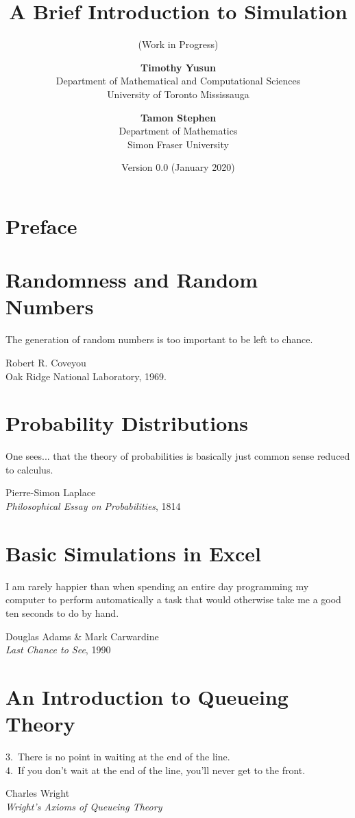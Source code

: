 \documentclass[11pt]{scrbook}
\title{A Brief Introduction to Simulation}
\subtitle{(Work in Progress)}
\date{Version 0.0 (January 2020)}
\author{\textbf{Timothy Yusun} \\ Department of Mathematical and Computational Sciences \\ University of Toronto Mississauga \and 
\textbf{Tamon Stephen} \\ Department of Mathematics \\ Simon Fraser University}
\theoremstyle{definition}
\begin{document}
\maketitle

\newpage
\chapter*{Preface}


\newpage
\tableofcontents


\newpage

\chapter{Randomness and Random Numbers}\label{sec1}
\setlength{\epigraphwidth}{3in}
\epigraph{The generation of random numbers is too important to be left to chance.}{Robert R. Coveyou \\ Oak Ridge National Laboratory, 1969.}



\newpage

\chapter{Probability Distributions}\label{sec2}
\setlength{\epigraphwidth}{3in}
\epigraph{One sees... that the theory of probabilities is basically just common sense reduced to calculus.}{Pierre-Simon Laplace \\ \emph{Philosophical Essay on Probabilities}, 1814}




\newpage

\chapter{Basic Simulations in Excel}\label{sec3}
\setlength{\epigraphwidth}{4in}
\epigraph{I am rarely happier than when spending an entire day programming my computer to perform automatically a task that would otherwise take me a good ten seconds to do by hand.}{Douglas Adams \& Mark Carwardine \\ \emph{Last Chance to See}, 1990}






\newpage

\chapter{An Introduction to Queueing Theory}\label{se:queueing}
\setlength{\epigraphwidth}{4.25in}
\epigraph{3.~There is no point in waiting at the end of the line. \\ 4.~If you don't wait at the end of the line, you'll never get to the front. }{Charles Wright\\ \emph{Wright's Axioms of Queueing Theory}}








\end{document}
